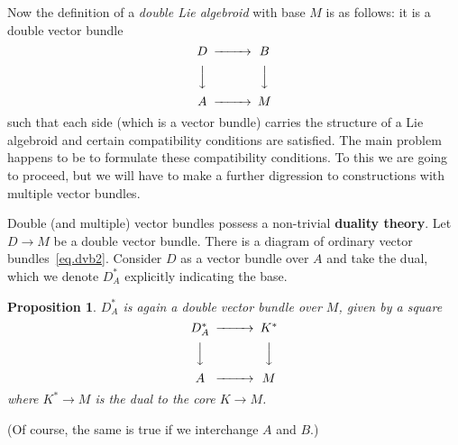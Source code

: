\documentclass[12pt,reqno,a4paper]{amsart}
\newtheorem{prop}{Proposition}[section]
\theoremstyle{definition}
\begin{document}
Now the definition of a \textit{double Lie algebroid} with base $M$ is as follows: it is a double vector bundle
\begin{equation} \label{eq.dvb3}
    \begin{CD} D@>>> B\\
                @VVV  @VVV \\
                A@>>>M
    \end{CD}
\end{equation}
such that each side (which is a vector bundle) carries the structure of a Lie algebroid and certain compatibility conditions are satisfied. The main problem happens to be to formulate these compatibility conditions. To this we are going to proceed, but we will have to make a further digression to constructions with multiple vector bundles.

Double (and multiple) vector bundles possess a non-trivial \textbf{duality theory}. Let $D\to M$ be a double vector bundle. There is a diagram of ordinary vector bundles~\eqref{eq.dvb2}. Consider $D$  as a vector bundle over $A$ and take the dual, which we denote $D^*_A$ explicitly indicating the base.

\begin{prop} $D^*_A$ is again a double vector bundle over $M$, given by a square
\begin{equation*} 
    \begin{CD} D^*_A@>>> K^*\\
                @VVV  @VVV \\
                A@>>>M
    \end{CD}
\end{equation*}
where $K^*\to M$ is the dual to the core $K\to M$.
\end{prop}
(Of course, the same is true if we interchange $A$ and $B$.)
\end{document}
